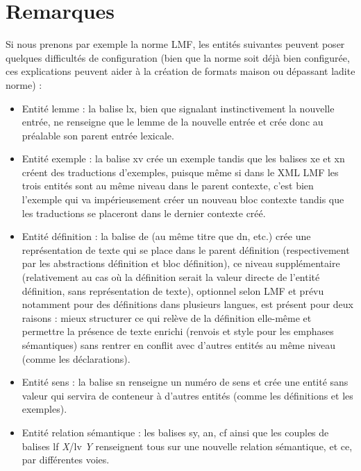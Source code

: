 \documentclass[10pt]{report}
\newcommand{\balise}[1]{\textcolor{red!80}{#1}}
\newcommand{\entité}[1]{\textcolor{blue!80!black}{#1}}
\newcommand{\caractéristique}[1]{\textcolor{green!60!black}{#1}}
\newcommand{\abstraction}[1]{\textcolor{blue!50!red}{#1}}
\begin{document}
\section{Remarques}

Si nous prenons par exemple la norme LMF, les entités suivantes peuvent poser quelques difficultés de configuration (bien que la norme soit déjà bien configurée, ces explications peuvent aider à la création de formats maison ou dépassant ladite norme) :
\begin{itemize}
    \item Entité \entité{lemme} : la balise \balise{lx}, bien que signalant instinctivement la nouvelle entrée, ne renseigne que le \entité{lemme} de la nouvelle entrée et crée donc au préalable son parent \entité{entrée lexicale}.
    \item Entité \entité{exemple} : la balise \balise{xv} crée un \entité{exemple} tandis que les balises \balise{xe} et \balise{xn} créent des \entité{traductions d’exemples}, puisque même si dans le XML LMF les trois entités sont au même niveau dans le parent \entité{contexte}, c’est bien l’\entité{exemple} qui va impérieusement créer un nouveau bloc \entité{contexte} tandis que les \entité{traductions} se placeront dans le dernier \entité{contexte} créé.
    \item Entité \entité{définition} : la balise \balise{de} (au même titre que \balise{dn}, etc.) crée une \entité{représentation de texte} qui se place dans le parent \entité{définition} (respectivement par les abstractions \abstraction{définition} et \abstraction{bloc définition}), ce niveau supplémentaire (relativement au cas où la définition serait la valeur directe de l’entité \entité{définition}, sans \entité{représentation de texte}), optionnel selon LMF et prévu notamment pour des définitions dans plusieurs langues, est présent pour deux raisons : mieux structurer ce qui relève de la définition elle-même et permettre la présence de texte enrichi (renvois et style pour les emphases sémantiques) sans rentrer en conflit avec d’autres entités au même niveau (comme les \entité{déclarations}).
    \item Entité \entité{sens} : la balise \entité{sn} renseigne un \caractéristique{numéro de sens} et crée une entité sans valeur qui servira de conteneur à d’autres entités (comme les \entité{définitions} et les \entité{exemples}).
    \item Entité \entité{relation sémantique} : les balises \balise{sy}, \balise{an}, \balise{cf} ainsi que les couples de balises \balise{lf} \textit{X}/\balise{lv} \textit{Y} renseignent tous sur une nouvelle \entité{relation sémantique}, et ce, par différentes voies.
\end{itemize}
\end{document}
